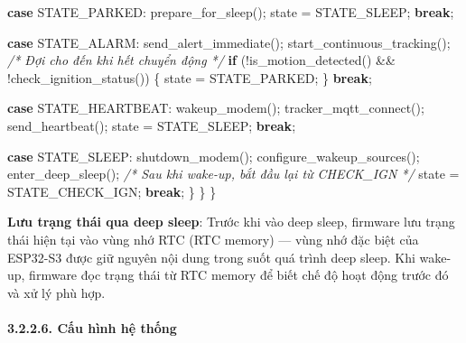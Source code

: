 \documentclass[13pt,a4paper]{extarticle}
\newenvironment{Shaded}{}{}
\newcommand{\CommentTok}[1]{\textcolor[rgb]{0.38,0.63,0.69}{\textit{#1}}}
\newcommand{\ControlFlowTok}[1]{\textcolor[rgb]{0.00,0.44,0.13}{\textbf{#1}}}
\newcommand{\NormalTok}[1]{#1}
\newcommand{\OperatorTok}[1]{\textcolor[rgb]{0.40,0.40,0.40}{#1}}
\renewcommand{\\}{\thesislongtableorignewline\hline}%
\begin{document}
\begin{Shaded}
\begin{Highlighting}[]
        \ControlFlowTok{case}\NormalTok{ STATE\_PARKED}\OperatorTok{:}
\NormalTok{            prepare\_for\_sleep}\OperatorTok{();}
\NormalTok{            state }\OperatorTok{=}\NormalTok{ STATE\_SLEEP}\OperatorTok{;}
            \ControlFlowTok{break}\OperatorTok{;}

        \ControlFlowTok{case}\NormalTok{ STATE\_ALARM}\OperatorTok{:}
\NormalTok{            send\_alert\_immediate}\OperatorTok{();}
\NormalTok{            start\_continuous\_tracking}\OperatorTok{();}
            \CommentTok{/* Đợi cho đến khi hết chuyển động */}
            \ControlFlowTok{if} \OperatorTok{(!}\NormalTok{is\_motion\_detected}\OperatorTok{()} \OperatorTok{\&\&} \OperatorTok{!}\NormalTok{check\_ignition\_status}\OperatorTok{())} \OperatorTok{\{}
\NormalTok{                state }\OperatorTok{=}\NormalTok{ STATE\_PARKED}\OperatorTok{;}
            \OperatorTok{\}}
            \ControlFlowTok{break}\OperatorTok{;}

        \ControlFlowTok{case}\NormalTok{ STATE\_HEARTBEAT}\OperatorTok{:}
\NormalTok{            wakeup\_modem}\OperatorTok{();}
\NormalTok{            tracker\_mqtt\_connect}\OperatorTok{();}
\NormalTok{            send\_heartbeat}\OperatorTok{();}
\NormalTok{            state }\OperatorTok{=}\NormalTok{ STATE\_SLEEP}\OperatorTok{;}
            \ControlFlowTok{break}\OperatorTok{;}

        \ControlFlowTok{case}\NormalTok{ STATE\_SLEEP}\OperatorTok{:}
\NormalTok{            shutdown\_modem}\OperatorTok{();}
\NormalTok{            configure\_wakeup\_sources}\OperatorTok{();}
\NormalTok{            enter\_deep\_sleep}\OperatorTok{();}
            \CommentTok{/* Sau khi wake{-}up, bắt đầu lại từ CHECK\_IGN */}
\NormalTok{            state }\OperatorTok{=}\NormalTok{ STATE\_CHECK\_IGN}\OperatorTok{;}
            \ControlFlowTok{break}\OperatorTok{;}
        \OperatorTok{\}}
    \OperatorTok{\}}
\OperatorTok{\}}
\end{Highlighting}
\end{Shaded}

\textbf{Lưu trạng thái qua deep sleep}: Trước khi vào deep sleep,
firmware lưu trạng thái hiện tại vào vùng nhớ RTC (RTC memory) --- vùng
nhớ đặc biệt của ESP32-S3 được giữ nguyên nội dung trong suốt quá trình
deep sleep. Khi wake-up, firmware đọc trạng thái từ RTC memory để biết
chế độ hoạt động trước đó và xử lý phù hợp.

\paragraph{3.2.2.6. Cấu hình hệ
thống}\label{3226-cux1ea5u-huxecnh-hux1ec7-thux1ed1ng}
\end{document}
